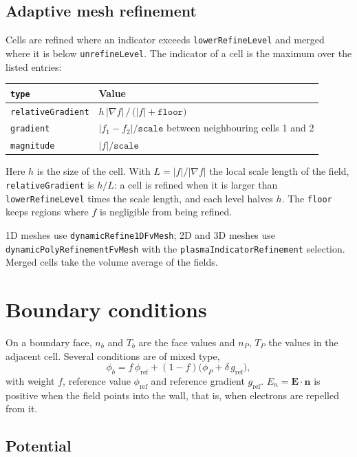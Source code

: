 \documentclass[11pt,a4paper]{article}
\newcommand{\kw}[1]{\texttt{#1}}
\newcommand{\bE}{\mathbf{E}}
\newcommand{\bn}{\mathbf{n}}
\begin{document}
\subsection{Adaptive mesh refinement}

Cells are refined where an indicator exceeds \kw{lowerRefineLevel} and merged
where it is below \kw{unrefineLevel}. The indicator of a cell is the maximum
over the listed entries:
\begin{center}
\begin{tabular}{@{}ll@{}}
\toprule
\kw{type} & Value \\
\midrule
\kw{relativeGradient} & $h\,|\nabla f|\,/\,\big(|f|+\kw{floor}\big)$ \\
\kw{gradient} & $|f_1-f_2|/\kw{scale}$ between neighbouring cells 1 and 2 \\
\kw{magnitude} & $|f|/\kw{scale}$ \\
\bottomrule
\end{tabular}
\end{center}
Here $h$ is the size of the cell. With $L=|f|/|\nabla f|$ the local scale
length of the field, \kw{relativeGradient} is $h/L$: a cell is refined when
it is larger than \kw{lowerRefineLevel} times the scale length, and each
level halves $h$. The \kw{floor} keeps regions where $f$ is negligible from
being refined.

1D meshes use \kw{dynamicRefine1DFvMesh}; 2D and 3D meshes use
\kw{dynamicPolyRefinementFvMesh} with the \kw{plasmaIndicatorRefinement}
selection. Merged cells take the volume average of the fields.

\section{Boundary conditions}

On a boundary face, $n_b$ and $T_b$ are the face values and $n_P$, $T_P$ the
values in the adjacent cell. Several conditions are of mixed type,
\begin{equation}
\phi_b = f\,\phi_\mathrm{ref} + (1-f)\Big(\phi_P + \delta\,g_\mathrm{ref}\Big),
\end{equation}
with weight $f$, reference value $\phi_\mathrm{ref}$ and reference gradient
$g_\mathrm{ref}$. $E_n=\bE\cdot\bn$ is positive when the field points into
the wall, that is, when electrons are repelled from it.

\subsection{Potential}\label{sec:bcphi}
\end{document}
